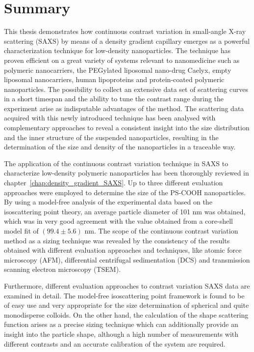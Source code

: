 \chapter{Summary} 
\label{chap:conclusions}
This thesis demonstrates how continuous contrast variation in small-angle X-ray scattering (SAXS) by means of a density gradient capillary emerges as a powerful characterization technique for low-density nanoparticles. The technique has proven efficient on a great variety of systems relevant to nanomedicine such as polymeric nanocarriers, the PEGylated liposomal nano-drug Caelyx, empty liposomal nanocarriers, human lipoproteins and protein-coated polymeric nanoparticles. The possibility to collect an extensive data set of scattering curves in a short timespan and the ability to tune the contrast range during the experiment arise as indisputable advantages of the method. The scattering data acquired with this newly introduced technique has been analysed with complementary approaches to reveal a consistent insight into the size distribution and the inner structure of the suspended nanoparticles, resulting in the determination of the size and density of the nanoparticles in a traceable way. 

The application of the continuous contrast variation technique in SAXS to characterize low-density polymeric nanoparticles has been thoroughly reviewed in chapter~\ref{chap:density_gradient_SAXS}. Up to three different evaluation approaches were employed to determine the size of the PS-COOH nanoparticles. By using a model-free analysis of the experimental data based on the isoscattering point theory, an average particle diameter of 101 nm was obtained, which was in very good agreement with the value obtained from a core-shell model fit of $\left( 99.4 \pm 5.6  \right)$ nm. The scope of the continuous contrast variation method as a sizing technique was revealed by the consistency of the results obtained with different evaluation approaches and techniques, like atomic force microscopy (AFM), differential centrifugal sedimentation (DCS) and transmission scanning electron microscopy (TSEM).

Furthermore, different evaluation approaches to contrast variation SAXS data are examined in detail. The model-free isoscattering point framework is found to be of easy use and very appropriate for the size determination of spherical and quite monodisperse colloids. On the other hand, the calculation of the shape scattering function arises as a precise sizing technique which can additionally provide an insight into the particle shape, although a high number of measurements with different contrasts and an accurate calibration of the system are required.

